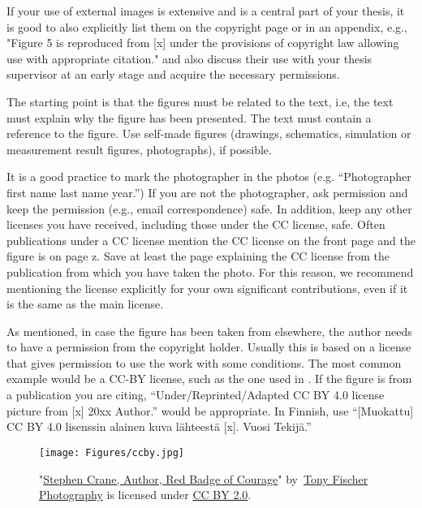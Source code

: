 If your use of external images is extensive and is a central part of
your thesis, it is good to also explicitly list them on the copyright
page or in an appendix, e.g., "Figure 5 is reproduced from [x] under
the provisions of copyright law allowing use with appropriate
citation." and also discuss their use with your thesis supervisor at
an early stage and acquire the necessary permissions.

The starting point is that the figures must be related to the text,
i.e, the text must explain why the figure has been presented. The text
must contain a reference to the figure. Use self-made figures
(drawings, schematics, simulation or measurement result figures,
photographs), if possible.

It is a good practice to mark the photographer in the photos
(e.g. “Photographer first name last name year.”) If you are not the
photographer, ask permission and keep the permission (e.g., email
correspondence) safe. In addition, keep any other licenses you have
received, including those under the CC license, safe. Often
publications under a CC license mention the CC license on the front
page and the figure is on page z. Save at least the page explaining
the CC license from the publication from which you have taken the
photo. For this reason, we recommend mentioning the license explicitly
for your own significant contributions, even if it is the same as
the main license.

As mentioned, in case the figure has been taken from elsewhere, the
author needs to have a permission from the copyright holder. Usually
this is based on a license that gives permission to use the work with
some conditions. The most common example would be a CC-BY license,
such as the one used in . If the figure is from a
publication you are citing, ``Under/Reprinted/Adapted CC BY 4.0 license
picture from [x] \textcopyright 20xx Author.'' would be
appropriate. In Finnish, use ``[Muokattu] CC BY 4.0 lisenssin alainen
kuva lähteestä [x]. \textcopyright Vuosi Tekijä.''

\begin{figure}[H]
\begin{center}
  \texttt{[image: Figures/ccby.jpg]}
\end{center}
\caption{"\href{https://openverse.org/image/110032f8-1a7a-421f-86b1-88fdfde2e44f
  }{Stephen Crane, Author, Red Badge of Courage}"
  by~\href{https://www.flickr.com/photos/tonythemisfit/}{Tony Fischer
  Photography} is licensed under
\href{https://creativecommons.org/licenses/by/2.0/}{CC BY 2.0}.}
\label{fig:ccbypic}
\end{figure}

